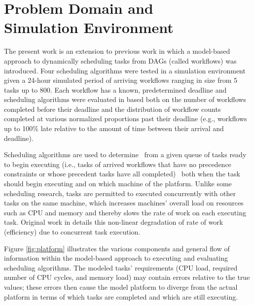 \documentclass[10pt]{csce}
\begin{document}
\section{Problem Domain and \\
Simulation Environment}
\label{sec:Framework}

The present work is an extension to previous work \cite{pdpta18} in which a
model-based approach to dynamically scheduling tasks from DAGs (called
workflows) was introduced.  Four scheduling algorithms were tested in a
simulation environment \cite{soasim} given a 24-hour simulated period
of arriving workflows ranging in size from 5 tasks up to 800.  Each workflow
has a known, predetermined deadline and scheduling algorithms were evaluated
in \cite{pdpta18} based both on the number of workflows completed before their
deadline and the distribution of workflow counts completed at various
normalized proportions past their deadline (e.g., workflows up to 100\% late
relative to the amount of time between their arrival and deadline).

Scheduling algorithms are used to determine \textemdash\ from a given queue of tasks
ready to begin executing (i.e., tasks of arrived workflows that have no
precedence constraints or whose precedent tasks have all completed)
\textemdash\ both when the task should begin executing and on which machine of
the platform. Unlike some scheduling research, tasks are permitted to executed
concurrently with other tasks on the same machine, which increases machines'
overall load on resources such as CPU and memory and thereby slows the rate of
work on each executing task.  Original work in \cite{pdpta09} details this
non-linear degradation of rate of work (efficiency) due to concurrent task
execution.

Figure \ref{fig:platform} illustrates the various components and general
flow of information within the model-based approach to executing and evaluating
scheduling algorithms.  The modeled tasks' requirements (CPU load,
required number of CPU cycles, and memory load) may contain errors relative to
the true values; these errors then cause the model platform to
diverge from the actual platform in terms of which tasks are completed and
which are still executing.
\end{document}
